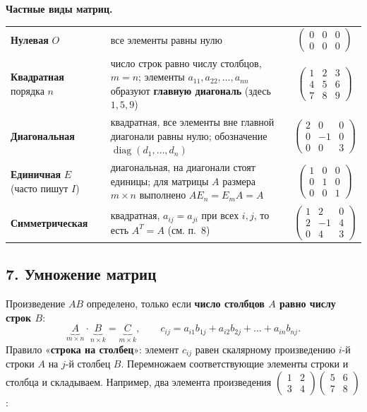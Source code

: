 \textbf{Частные виды матриц.}
\begin{center}
\renewcommand{\arraystretch}{1.35}
\begin{tabular}{@{}>{\raggedright\arraybackslash}p{3.4cm}>{\raggedright\arraybackslash}p{7.0cm}c@{}}
\textbf{Нулевая} $O$ & все элементы равны нулю & $\begin{pmatrix}0&0&0\\0&0&0\end{pmatrix}$ \\[1.6em]
\textbf{Квадратная} порядка $n$ & число строк равно числу столбцов, $m=n$; элементы $a_{11},a_{22},\dots,a_{nn}$ образуют \textbf{главную диагональ} (здесь $1,5,9$) & $\begin{pmatrix}1&2&3\\4&5&6\\7&8&9\end{pmatrix}$ \\[1.9em]
\textbf{Диагональная} & квадратная, все элементы вне главной диагонали равны нулю; обозначение $\operatorname{diag}(d_1,\dots,d_n)$ & $\begin{pmatrix}2&0&0\\0&-1&0\\0&0&3\end{pmatrix}$ \\[1.9em]
\textbf{Единичная} $E$ (часто пишут $I$) & диагональная, на диагонали стоят единицы; для матрицы $A$ размера $m\times n$ выполнено $AE_n=E_mA=A$ & $\begin{pmatrix}1&0&0\\0&1&0\\0&0&1\end{pmatrix}$ \\[1.9em]
\textbf{Симметрическая} & квадратная, $a_{ij}=a_{ji}$ при всех $i,j$, то есть $A^T=A$ (см. п.~8) & $\begin{pmatrix}1&2&0\\2&-1&4\\0&4&3\end{pmatrix}$ \\
\end{tabular}
\end{center}

\subsection*{7. Умножение матриц}
Произведение $AB$ определено, только если \textbf{число столбцов $A$ равно числу строк $B$}:
\[
\underbrace{A}_{m\times n}\cdot\underbrace{B}_{n\times k}=\underbrace{C}_{m\times k},
\qquad
c_{ij}=a_{i1}b_{1j}+a_{i2}b_{2j}+\dots+a_{in}b_{nj}.
\]
Правило «\textbf{строка на столбец}»: элемент $c_{ij}$ равен скалярному произведению $i$-й строки $A$ на $j$-й столбец $B$. Перемножаем соответствующие элементы строки и столбца и складываем. Например, два элемента произведения $\left(\begin{smallmatrix}1&2\\3&4\end{smallmatrix}\right)\left(\begin{smallmatrix}5&6\\7&8\end{smallmatrix}\right)$:

